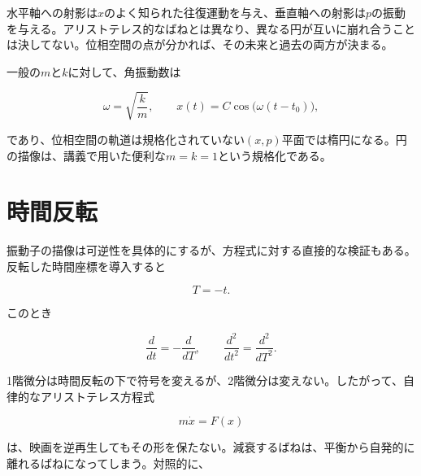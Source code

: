 水平軸への射影は\(x\)のよく知られた往復運動を与え、垂直軸への射影は\(p\)の振動を与える。アリストテレス的なばねとは異なり、異なる円が互いに崩れ合うことは決してない。位相空間の点が分かれば、その未来と過去の両方が決まる。

一般の\(m\)と\(k\)に対して、角振動数は

\begin{equation}
  \omega=\sqrt{\frac{k}{m}},
  \qquad
  x(t)=C\cos\bigl(\omega(t-t_0)\bigr),
  \label{eq:general-oscillator-frequency}
\end{equation}

であり、位相空間の軌道は規格化されていない\((x,p)\)平面では楕円になる。円の描像は、講義で用いた便利な\(m=k=1\)という規格化である。

\begin{classroomqa}
\end{classroomqa}

\section{時間反転}

振動子の描像は可逆性を具体的にするが、方程式に対する直接的な検証もある。反転した時間座標を導入すると

\begin{equation}
  T=-t.
  \label{eq:reverse-time}
\end{equation}

このとき

\begin{equation}
  \frac{d}{dt}=-\frac{d}{dT},
  \qquad
  \frac{d^2}{dt^2}=\frac{d^2}{dT^2}.
  \label{eq:time-derivative-parity}
\end{equation}

1階微分は時間反転の下で符号を変えるが、2階微分は変えない。したがって、自律的なアリストテレス方程式

\begin{equation}
  m\dot x=F(x)
  \label{eq:aristotle-time-reversal}
\end{equation}

は、映画を逆再生してもその形を保たない。減衰するばねは、平衡から自発的に離れるばねになってしまう。対照的に、

